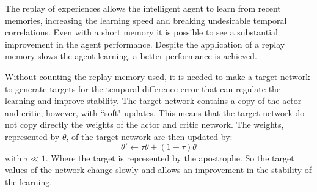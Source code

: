 The replay of experiences allows the intelligent agent to learn from recent memories, increasing  the learning speed and breaking undesirable temporal correlations.
Even with a short memory it is possible to see a substantial improvement in the agent performance.
Despite the application of a replay memory slows the agent learning, a better performance is achieved.

Without counting the replay memory used, it is needed to make a target network to generate targets for the temporal-difference error that can regulate the learning and improve stability.
The target network contains a copy of the actor and critic, however, with ``soft" updates.
This means that the target network do not copy directly the weights of the actor and critic network.
The weights, represented by $\theta$, of the target network are then updated by:
\begin{equation}
    \theta' \leftarrow \tau\theta + (1-\tau)\theta
\end{equation}
with $\tau \ll 1$. 
Where the target is represented by the apostrophe.
So the target values of the network change slowly and allows an improvement in the stability of the learning.
